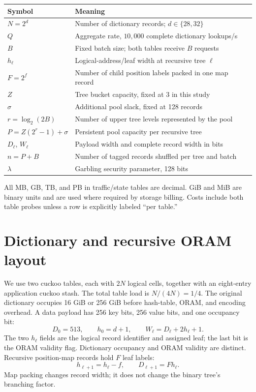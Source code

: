 \documentclass[11pt]{article}
\begin{document}
\begin{center}\small
\begin{tabularx}{\linewidth}{lX}\toprule
Symbol & Meaning\\\midrule
$N=2^d$ & Number of dictionary records; $d\in\{28,32\}$\\
$Q$ & Aggregate rate, $10{,}000$ complete dictionary lookups/s\\
$B$ & Fixed batch size; both tables receive $B$ requests\\
$h_\ell$ & Logical-address/leaf width at recursive tree $\ell$\\
$F=2^f$ & Number of child position labels packed in one map record\\
$Z$ & Tree bucket capacity, fixed at 3 in this study\\
$\sigma$ & Additional pool slack, fixed at 128 records\\
$r=\log_2(2B)$ & Number of upper tree levels represented by the pool\\
$P=Z(2^r-1)+\sigma$ & Persistent pool capacity per recursive tree\\
$D_\ell$, $W_\ell$ & Payload width and complete record width in bits\\
$n=P+B$ & Number of tagged records shuffled per tree and batch\\
$\lambda$ & Garbling security parameter, 128 bits\\
\bottomrule\end{tabularx}
\end{center}
All MB, GB, TB, and PB in traffic/state tables are decimal. GiB and MiB are
binary units and are used where required by storage billing. Costs include
both table probes unless a row is explicitly labeled ``per table.''

\section{Dictionary and recursive ORAM layout}
\label{sec:layout}
We use two cuckoo tables, each with $2N$ logical cells, together with an
eight-entry application cuckoo stash. The total table load is $N/(4N)=1/4$.
The original dictionary occupies 16 GiB or 256 GiB before hash-table, ORAM,
and encoding overhead. A data payload has 256 key bits, 256 value bits, and
one occupancy bit:
\begin{equation}
 D_0=513,\qquad h_0=d+1,\qquad W_\ell=D_\ell+2h_\ell+1.
\end{equation}
The two $h_\ell$ fields are the logical record identifier and assigned leaf;
the last bit is the ORAM validity flag. Dictionary occupancy and ORAM
validity are distinct. Recursive position-map records hold $F$ leaf labels:
\begin{equation}
 h_{\ell+1}=h_\ell-f,\qquad D_{\ell+1}=Fh_\ell.
\end{equation}
Map packing changes record width; it does not change the binary tree's
branching factor.
\end{document}
